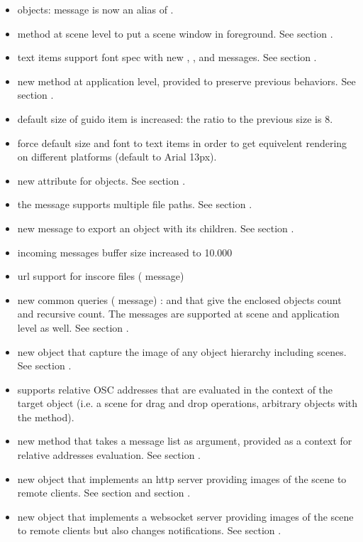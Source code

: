 \begin{itemize}
\item {} objects:  message is now an alias of . 
\item {} method at scene level to put a scene window in foreground. See section .
\item text items support font spec with new , ,  and  messages. See section .
\item new  method at application level, provided to preserve previous behaviors. See section .
\item default size of guido item is increased: the ratio to the previous size is 8.
\item force default size and font to text items in order to get equivelent rendering on different platforms (default to Arial 13px).
\item new  attribute for  objects. See section .
\item the  message supports multiple file paths. See section .
\item new  message to export an object with its children. See section .

\item incoming messages buffer size increased to 10.000
\item url support for inscore files ( message)

\item new common queries ( message) :  and  that give the enclosed objects count and recursive count. The messages are supported at scene and application level as well. See section .
\item new  object that capture the image of any object hierarchy including scenes. See section .
\item supports relative OSC addresses that are evaluated in the context of the target object 
  (i.e. a scene for drag and drop operations, arbitrary objects with the  method).
\item new  method that takes a message list as argument, provided as a context for relative addresses evaluation. See section .
\item new  object that implements an http server providing images of the scene to remote clients. See section  and section .
\item new  object that implements a websocket server providing images of the scene to remote clients but also changes notifications. See section .


\end{itemize}
